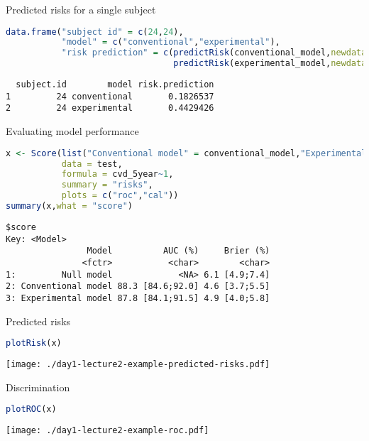 \documentclass{beamer}\usepackage{listings}
\begin{document}
\begin{frame}[label={sec:orgd092c99},fragile]{Predicted risks for a single subject}
 \begin{lstlisting}[language=r,numbers=none,otherkeywords={}, deletekeywords={model}]
data.frame("subject id" = c(24,24),
           "model" = c("conventional","experimental"),
           "risk prediction" = c(predictRisk(conventional_model,newdata = test[24,]),
                                 predictRisk(experimental_model,newdata = test[24,])))
\end{lstlisting}

\label{}
\begin{verbatim}
  subject.id        model risk.prediction
1         24 conventional       0.1826537
2         24 experimental       0.4429426
\end{verbatim}
\end{frame}
\begin{frame}[label={sec:orgbdb2aaa},fragile]{Evaluating model performance}
 \begin{lstlisting}[language=r,numbers=none,otherkeywords={}, deletekeywords={model,c}]
x <- Score(list("Conventional model" = conventional_model,"Experimental model" = experimental_model),
           data = test,
           formula = cvd_5year~1,
           summary = "risks",
           plots = c("roc","cal"))
summary(x,what = "score")
\end{lstlisting}

\label{}
\begin{verbatim}
$score
Key: <Model>
                Model          AUC (%)     Brier (%)
               <fctr>           <char>        <char>
1:         Null model             <NA> 6.1 [4.9;7.4]
2: Conventional model 88.3 [84.6;92.0] 4.6 [3.7;5.5]
3: Experimental model 87.8 [84.1;91.5] 4.9 [4.0;5.8]
\end{verbatim}
\end{frame}
\begin{frame}[label={sec:orgf1b068e},fragile]{Predicted risks}
 \begin{lstlisting}[language=r,numbers=none]
plotRisk(x)
\end{lstlisting}

\begin{center}
\texttt{[image: ./day1-lecture2-example-predicted-risks.pdf]}
\end{center}
\end{frame}
\begin{frame}[label={sec:orgeba4739},fragile]{Discrimination}
 \begin{lstlisting}[language=r,numbers=none]
plotROC(x)
\end{lstlisting}

\begin{center}
\texttt{[image: ./day1-lecture2-example-roc.pdf]}
\end{center}
\end{frame}
\end{document}
